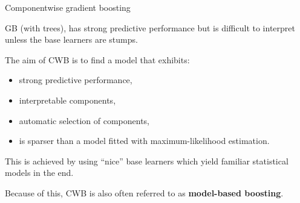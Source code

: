 \documentclass[11pt,compress,t,notes=noshow, xcolor=table]{beamer}
\begin{document}

\begin{vbframe}{Componentwise gradient boosting}

GB (with trees), has strong predictive
performance but is difficult to interpret unless the base learners are stumps.

\lz

The aim of CWB is to find a model that exhibits:

\begin{itemize}
  \item
    strong predictive performance,

  \item
    interpretable components,

  \item
    automatic selection of components,

  \item
    is sparser than a model fitted with maximum-likelihood estimation.
\end{itemize}

\lz

This is achieved by using \enquote{nice} base learners which yield familiar
statistical models
in the end.

\lz

Because of this, CWB is also often referred to as \textbf{model-based boosting}.

\end{vbframe}

\end{document}
